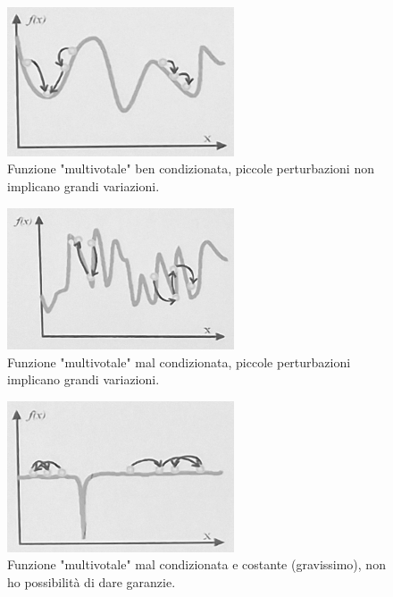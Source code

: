 \newpage
\begin{figure}[h!]
    \centering 
    \includegraphics[width=0.6\textwidth]{Esterni/Altro/imgs/t3.jpg} 
    \caption{ Funzione "multivotale" ben condizionata, piccole perturbazioni non implicano grandi variazioni.} 
    \label{fig:type3} 
\end{figure}
\begin{figure}[h!]
    \centering 
    \includegraphics[width=0.6\textwidth]{Esterni/Altro/imgs/t4.jpg} 
    \caption{ Funzione "multivotale" mal condizionata, piccole perturbazioni implicano grandi variazioni.} 
    \label{fig:type4} 
\end{figure}
\begin{figure}[h!]
    \centering 
    \includegraphics[width=0.6\textwidth]{Esterni/Altro/imgs/t5.jpg} 
    \caption{ Funzione "multivotale" mal condizionata e costante (gravissimo), non ho possibilità di dare garanzie.} 
    \label{fig:type5} 
\end{figure}
\newpage
